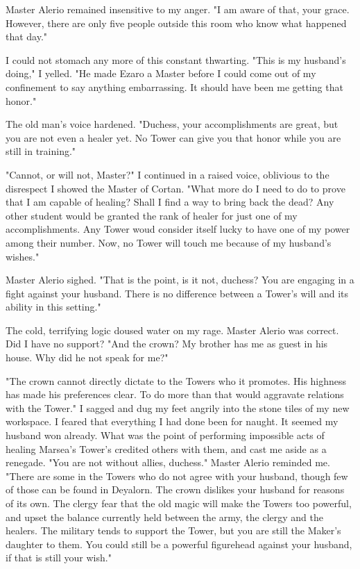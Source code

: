 \documentclass{article}
\begin{document}
Master Alerio remained insensitive to my anger. "I am aware of that, your grace. However, there are only five people outside this room who know what happened that day."

I could not stomach any more of this constant thwarting. "This is my husband's doing," I yelled. "He made Ezaro a Master before I could come out of my confinement to say anything embarrassing. It should have been me getting that honor."

The old man's voice hardened. "Duchess, your accomplishments are great, but you are not even a healer yet. No Tower can give you that honor while you are still in training."

"Cannot, or will not, Master?" I continued in a raised voice, oblivious to the disrespect I showed the Master of Cortan. "What more do I need to do to prove that I am capable of healing? Shall I find a way to bring back the dead? Any other student would be granted the rank of healer for just one of my accomplishments. Any Tower woud consider itself lucky to have one of my power among their number. Now, no Tower will touch me because of my husband's wishes."

Master Alerio sighed. "That is the point, is it not, duchess? You are engaging in a fight against your husband. There is no difference between a Tower's will and its ability in this setting." 

The cold, terrifying logic doused water on my rage.  Master Alerio was correct. Did I have no support? "And the crown? My brother has me as guest in his house. Why did he not speak for me?"

"The crown cannot directly dictate to the Towers who it promotes. His highness has made his preferences clear. To do more than that would aggravate relations with the Tower." I sagged and dug my feet angrily into the stone tiles of my new workspace. I feared that everything I had done been for naught. It seemed my husband won already. What was the point of performing impossible acts of healing Marsea's Tower's credited others with them, and cast me aside as a renegade. "You are not without allies, duchess." Master Alerio reminded me. "There are some in the Towers who do not agree with your husband, though few of those can be found in Deyalorn. The crown dislikes your husband for reasons of its own. The clergy fear that the old magic will make the Towers too powerful, and upset the balance currently held between the army, the clergy and the healers. The military tends to support the Tower, but you are still the Maker's daughter to them. You could still be a powerful figurehead against your husband, if that is still your wish."
\end{document}
